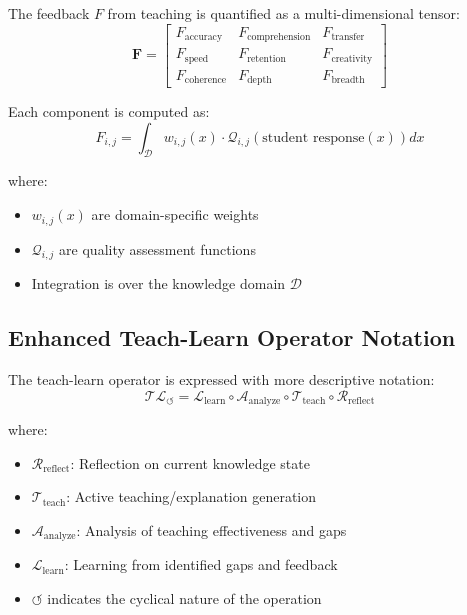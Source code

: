 The feedback $F$ from teaching is quantified as a multi-dimensional tensor:
\begin{equation}
\mathbf{F} = \begin{bmatrix}
F_{\text{accuracy}} & F_{\text{comprehension}} & F_{\text{transfer}} \\
F_{\text{speed}} & F_{\text{retention}} & F_{\text{creativity}} \\
F_{\text{coherence}} & F_{\text{depth}} & F_{\text{breadth}}
\end{bmatrix}
\end{equation}

Each component is computed as:
\begin{equation}
F_{i,j} = \int_{\mathcal{D}} w_{i,j}(x) \cdot \mathcal{Q}_{i,j}(\text{student response}(x)) dx
\end{equation}

where:
\begin{itemize}
    \item $w_{i,j}(x)$ are domain-specific weights
    \item $\mathcal{Q}_{i,j}$ are quality assessment functions
    \item Integration is over the knowledge domain $\mathcal{D}$
\end{itemize}

\subsection{Enhanced Teach-Learn Operator Notation}

The teach-learn operator is expressed with more descriptive notation:
\begin{equation}
\mathcal{T}\mathcal{L}_{\circlearrowleft} = \mathcal{L}_{\text{learn}} \circ \mathcal{A}_{\text{analyze}} \circ \mathcal{T}_{\text{teach}} \circ \mathcal{R}_{\text{reflect}}
\end{equation}

where:
\begin{itemize}
    \item $\mathcal{R}_{\text{reflect}}$: Reflection on current knowledge state
    \item $\mathcal{T}_{\text{teach}}$: Active teaching/explanation generation
    \item $\mathcal{A}_{\text{analyze}}$: Analysis of teaching effectiveness and gaps
    \item $\mathcal{L}_{\text{learn}}$: Learning from identified gaps and feedback
    \item $\circlearrowleft$ indicates the cyclical nature of the operation
\end{itemize}

